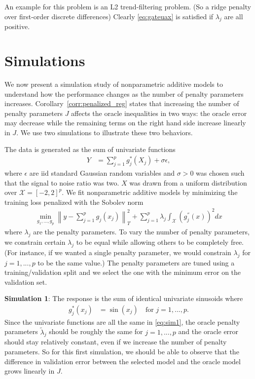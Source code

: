 \documentclass[12pt]{article} %
\theoremstyle{definition}
\begin{document}
An example for this problem is an L2 trend-filtering problem.
(So a ridge penalty over first-order discrete differences)
Clearly \eqref{eq:gateuax} is satisfied if $\lambda_j$ are all positive.

\section{Simulations}\label{sec:simulations}

We now present a simulation study of nonparametric additive models to understand how the performance changes as the number of penalty parameters increases. 
Corollary~\ref{corr:penalized_reg} states that increasing the number of penalty parameters $J$ affects the oracle inequalities in two ways: the oracle error may decrease while the remaining terms on the right hand side increase linearly in $J$. We use two simulations to illustrate these two behaviors.

The data is generated as the sum of univariate functions
\begin{align}
Y &= \sum_{j=1}^p g_j^*(X_j) + \sigma \epsilon,
\label{eq:sim_general}
\end{align}
where $\epsilon$ are iid standard Gaussian random variables and $\sigma > 0$ was chosen such that the signal to noise ratio was two. $X$ was drawn from a uniform distribution over $\mathcal{X} = [-2, 2]^p$.
We fit nonparametric additive models by minimizing the training loss penalized with the Sobolev norm
\begin{align}
\min_{g_1, ..., g_p} \left \| y - \sum_{j=1}^p g_j(x_j) \right \|_T^2 + \sum_{j=1}^p \lambda_j \int_{\mathcal{X}} \left (g_j^{''}(x) \right )^2 dx
\label{eq:penal_simulation}
\end{align}
where $\lambda_j$ are the penalty parameters.
To vary the number of penalty parameters, we constrain certain $\lambda_j$ to be equal while allowing others to be completely free.
(For instance, if we wanted a single penalty parameter, we would constrain $\lambda_j$ for $j=1,...,p$ to be the same value.) 
The penalty parameters are tuned using a training/validation split and we select the one with the minimum error on the validation set.

\textbf{Simulation 1}: The response is the sum of identical univariate sinusoids where
\begin{align}
g_j^*(x_j) &= \sin(x_j) \quad \text{for } j = 1,...,p.
\label{eq:sim1}
\end{align} 
Since the univariate functions are all the same in \eqref{eq:sim1}, the oracle penalty parameters $\tilde \lambda_j$ should be roughly the same for $j = 1,...,p$ and the oracle error should stay relatively constant, even if we increase the number of penalty parameters. So for this first simulation, we should be able to observe that the difference in validation error between the selected model and the oracle model grows linearly in $J$.
\end{document}
